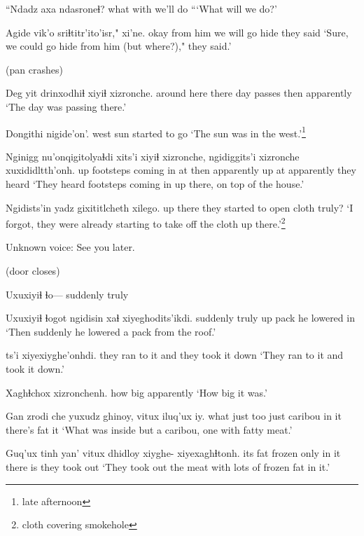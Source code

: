 \documentclass[12pt]{article}
\begin{document}
\gll ``Ndadz axa  ndasroneɬ?
 what  with  {we'll do}
\glt ```What will we do?'
\glend

\gll Agide vik'o    sriɬtitr'ito'isr," xi'ne.
okay  {from him} {we will go hide}  {they said}
\glt `Sure, we could go hide from him (but where?)," they said.'
\glend

(pan crashes) 

\gll Deg         yit   drinxodhiɬ xiyiɬ xizronche. 
{around here} there {day passes} then  apparently
\glt `The day was passing there.'
\glend

\gll Dongithi nigide'on'.
west     {sun started to go}
\glt `The sun was in the west.'\footnote{late afternoon}
\glend

\gll Nginigg nu'onqigitolyaɬdi xits'i xiyiɬ xizronche, ngidiggits'i xizronche xuxididltth'onh.
up      { footsteps coming in}      at  then apparently  up      at       apparently   {they heard     }
\glt `They heard footsteps coming in up there, on top of the house.' 
\glend

\gll Ngidists'in {yadz gixititlcheth}         xilego.
{up there}    {they started to open cloth} truly?
\glt `I forgot, they were already starting to take off the cloth up there.'\footnote{cloth covering smokehole}
\glend

Unknown voice:  See you later.

(door closes)

\gll Uxuxiyiɬ ɬo---   
suddenly truly 
\glt 
\glend

\gll Uxuxiyiɬ ɬogot ngidisin xaɬ  xiyeghodits'ikdi.
suddenly truly up       pack {he lowered in}
\glt `Then suddenly he lowered a pack from the roof.'
\glend

 ts'i xiyexiyghe'onhdi. 
{they ran to it}     and    {they took it down}
\glt `They ran to it and took it down.'
\glend

\gll Xaghɬchox xizronchenh. 
{how big} apparently
\glt `How big it was.'
\glend

\gll Gan zrodi che yuxudz ghinoy, vitux iluq'ux iy. 
what  just    too just        caribou {in it} {there's fat} it
\glt `What was inside but a caribou, one with fatty meat.'
\glend

\gll Guq'ux tinh   yan' vitux dhidloy  xiyghe- xiyexaghɬtonh.
{its fat}    frozen only {in it} {there is} {}        {they took out}
\glt `They took out the meat with lots of frozen fat in it.'
\glend
\end{document}
